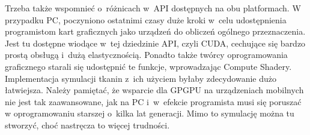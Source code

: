 	Trzeba także wspomnieć o~różnicach w~API dostępnych na obu platformach. W przypadku PC, poczyniono ostatnimi czasy duże kroki w~celu udostępnienia programistom kart graficznych jako urządzeń do obliczeń ogólnego przeznaczenia. Jest tu dostępne wiodące w~tej dziedzinie API, czyli CUDA, cechujące się bardzo prostą obsługą i~dużą elastycznością. Ponadto także twórcy oprogramowania graficznego starali się udostępnić te funkcje, wprowadzając Compute Shadery. Implementacja symulacji tkanin z~ich użyciem byłaby zdecydowanie dużo łatwiejsza. Należy pamiętać, że wsparcie dla GPGPU na urządzeniach mobilnych nie jest tak zaawansowane, jak na PC i~w~efekcie programista musi się poruszać w oprogramowaniu starszej o~kilka lat generacji. Mimo to symulację można tu stworzyć, choć nastręcza to więcej trudności.
	
	
	
	
	
	

